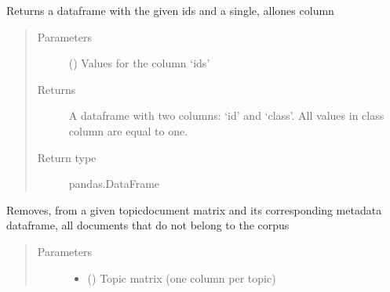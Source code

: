 \documentclass[letterpaper,10pt,english]{sphinxmanual}
\begin{document}
\begin{fulllineitems}
\begin{fulllineitems}
\end{fulllineitems}


\begin{fulllineitems}
\label{\detokenize{dc_preprocessor:src.domain_classifier.preprocessor.CorpusDFProcessor.make_pos_labels_df}}
\sphinxAtStartPar
Returns a dataframe with the given ids and a single, all\sphinxhyphen{}ones column
\begin{quote}\begin{description}
\item[{Parameters}] \leavevmode
\sphinxAtStartPar
{} () \textendash{} Values for the column ‘ids’

\item[{Returns}] \leavevmode
\sphinxAtStartPar
{} \textendash{} A dataframe with two columns: ‘id’ and ‘class’. All values in
class column are equal to one.

\item[{Return type}] \leavevmode
\sphinxAtStartPar
pandas.DataFrame

\end{description}\end{quote}

\end{fulllineitems}


\begin{fulllineitems}
\label{\detokenize{dc_preprocessor:src.domain_classifier.preprocessor.CorpusDFProcessor.remove_docs_from_topics}}
\sphinxAtStartPar
Removes, from a given topic\sphinxhyphen{}document matrix and its corresponding
metadata dataframe, all documents that do not belong to the corpus
\begin{quote}\begin{description}
\item[{Parameters}] \leavevmode\begin{itemize}
\item {} 
\sphinxAtStartPar
{} () \textendash{} Topic matrix (one column per topic)


\end{itemize}
\end{description}
\end{quote}
\end{fulllineitems}
\end{fulllineitems}
\end{document}
